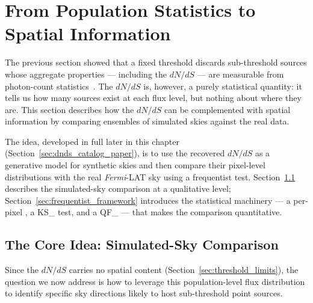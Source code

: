 
\section{From Population Statistics to Spatial Information}
\label{sec:pop_to_spatial}

The previous section showed that a fixed \TS threshold discards sub-threshold sources whose aggregate properties --- including the $dN/dS$ --- are measurable from photon-count statistics~\cite{malyshev2011statistics,Cuoco-1pdf}.
The $dN/dS$ is, however, a purely statistical quantity: it tells us how many sources exist at each flux level, but nothing about where they are.
This section describes how the $dN/dS$ can be complemented with spatial information by comparing ensembles of simulated skies against the real data.

The idea, developed in full later in this chapter (Section~\ref{sec:dnds_catalog_paper}), is to use the recovered $dN/dS$ as a generative model for synthetic skies and then compare their pixel-level \TS distributions with the real \textit{Fermi}-LAT sky using a frequentist test.
Section~\ref{sec:simulated_sky} describes the simulated-sky comparison at a qualitative level; Section~\ref{sec:frequentist_framework} introduces the statistical machinery --- a per-pixel \TS, a \gls{KS_} test, and a \gls{QF_} --- that makes the comparison quantitative.

\subsection{The Core Idea: Simulated-Sky Comparison}
\label{sec:simulated_sky}

Since the $dN/dS$ carries no spatial content (Section~\ref{sec:threshold_limits}), the question we now address is how to leverage this population-level flux distribution to identify specific sky directions likely to host sub-threshold point sources.

